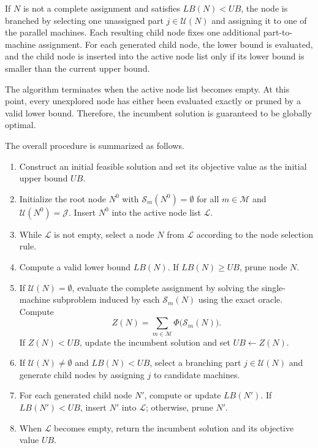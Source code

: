 \documentclass[letterpaper, 10 pt, conference]{ieeeconf}  %
\begin{document}
If $N$ is not a complete assignment and satisfies $LB(N)<UB$, the node is
branched by selecting one unassigned part $j\in\mathcal{U}(N)$ and assigning
it to one of the parallel machines. Each resulting child node fixes one
additional part-to-machine assignment. For each generated child node, the
lower bound is evaluated, and the child node is inserted into the active
node list only if its lower bound is smaller than the current upper bound.

The algorithm terminates when the active node list becomes empty. At this
point, every unexplored node has either been evaluated exactly or pruned by
a valid lower bound. Therefore, the incumbent solution is guaranteed to be
globally optimal.

The overall procedure is summarized as follows.

\begin{enumerate}
	\item Construct an initial feasible solution and set its objective value
	as the initial upper bound $UB$.
	
	\item Initialize the root node $N^0$ with
	$\mathcal{S}_m(N^0)=\emptyset$ for all $m\in\mathcal{M}$ and
	$\mathcal{U}(N^0)=\mathcal{J}$. Insert $N^0$ into the active node list
	$\mathcal{L}$.
	
	\item While $\mathcal{L}$ is not empty, select a node $N$ from
	$\mathcal{L}$ according to the node selection rule.
	
	\item Compute a valid lower bound $LB(N)$. If $LB(N)\ge UB$, prune
	node $N$.
	
	\item If $\mathcal{U}(N)=\emptyset$, evaluate the complete assignment by
	solving the single-machine subproblem induced by each
	$\mathcal{S}_m(N)$ using the exact oracle. Compute
	\[
	Z(N)=\sum_{m\in\mathcal{M}}\Phi\bigl(\mathcal{S}_m(N)\bigr).
	\]
	If $Z(N)<UB$, update the incumbent solution and set $UB\leftarrow Z(N)$.
	
	\item If $\mathcal{U}(N)\neq\emptyset$ and $LB(N)<UB$, select a
	branching part $j\in\mathcal{U}(N)$ and generate child nodes by assigning
	$j$ to candidate machines.
	
	\item For each generated child node $N'$, compute or update $LB(N')$.
	If $LB(N')<UB$, insert $N'$ into $\mathcal{L}$; otherwise, prune $N'$.
	
	\item When $\mathcal{L}$ becomes empty, return the incumbent solution
	and its objective value $UB$.
\end{enumerate}
\end{document}
